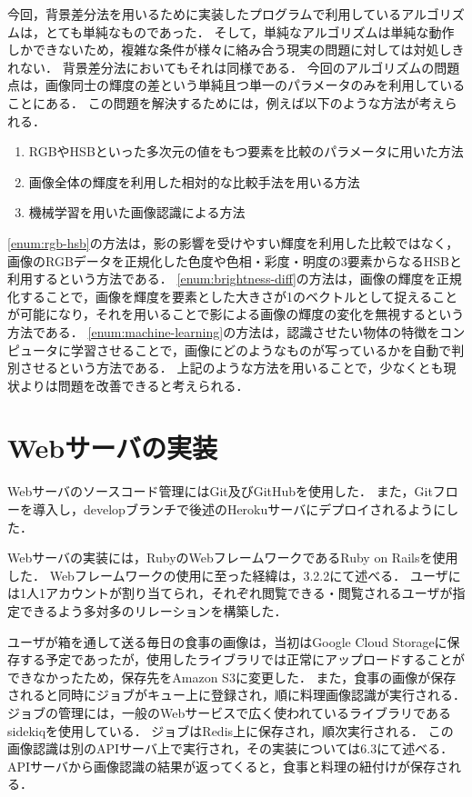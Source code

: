 \documentclass[../report]{subfiles}
\begin{document}
今回，背景差分法を用いるために実装したプログラムで利用しているアルゴリズムは，とても単純なものであった．
そして，単純なアルゴリズムは単純な動作しかできないため，複雑な条件が様々に絡み合う現実の問題に対しては対処しきれない．
背景差分法においてもそれは同様である．
今回のアルゴリズムの問題点は，画像同士の輝度の差という単純且つ単一のパラメータのみを利用していることにある．
この問題を解決するためには，例えば以下のような方法が考えられる．
\begin{enumerate}
    \item \label{enum:rgb-hsb} RGBやHSBといった多次元の値をもつ要素を比較のパラメータに用いた方法
    \item \label{enum:brightness-diff} 画像全体の輝度を利用した相対的な比較手法を用いる方法
    \item \label{enum:machine-learning} 機械学習を用いた画像認識による方法
\end{enumerate}
\ref{enum:rgb-hsb}の方法は，影の影響を受けやすい輝度を利用した比較ではなく，画像のRGBデータを正規化した色度や色相・彩度・明度の3要素からなるHSBと利用するという方法である．
\ref{enum:brightness-diff}の方法は，画像の輝度を正規化することで，画像を輝度を要素とした大きさが1のベクトルとして捉えることが可能になり，それを用いることで影による画像の輝度の変化を無視するという方法である．
\ref{enum:machine-learning}の方法は，認識させたい物体の特徴をコンピュータに学習させることで，画像にどのようなものが写っているかを自動で判別させるという方法である．
上記のような方法を用いることで，少なくとも現状よりは問題を改善できると考えられる．


\section{Webサーバの実装}
Webサーバのソースコード管理にはGit及びGitHubを使用した．
また，Gitフローを導入し，developブランチで後述のHerokuサーバにデプロイされるようにした．

Webサーバの実装には，RubyのWebフレームワークであるRuby on Railsを使用した．
Webフレームワークの使用に至った経緯は，3.2.2にて述べる．
ユーザには1人1アカウントが割り当てられ，それぞれ閲覧できる・閲覧されるユーザが指定できるよう多対多のリレーションを構築した．

ユーザが箱を通して送る毎日の食事の画像は，当初はGoogle Cloud Storageに保存する予定であったが，使用したライブラリでは正常にアップロードすることができなかったため，保存先をAmazon S3に変更した．
また，食事の画像が保存されると同時にジョブがキュー上に登録され，順に料理画像認識が実行される．
ジョブの管理には，一般のWebサービスで広く使われているライブラリであるsidekiqを使用している．
ジョブはRedis上に保存され，順次実行される．
この画像認識は別のAPIサーバ上で実行され，その実装については6.3にて述べる．
APIサーバから画像認識の結果が返ってくると，食事と料理の紐付けが保存される．
\end{document}
